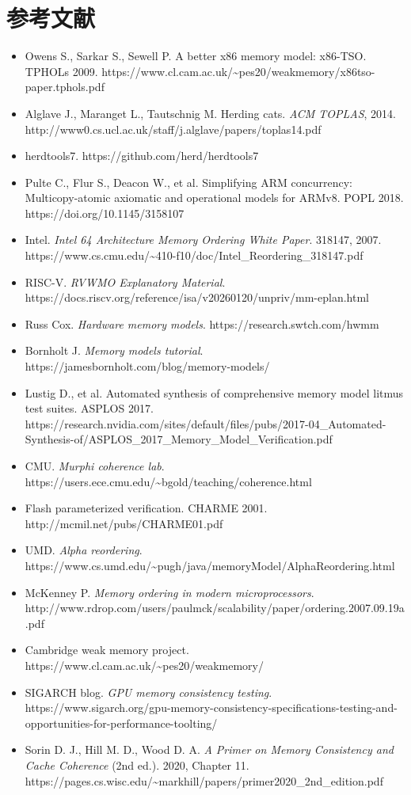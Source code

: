 \section*{参考文献}
\begin{itemize}
\item Owens S., Sarkar S., Sewell P. A better x86 memory model: x86-TSO. TPHOLs 2009. https://www.cl.cam.ac.uk/\textasciitilde{}pes20/weakmemory/x86tso-paper.tphols.pdf
\item Alglave J., Maranget L., Tautschnig M. Herding cats. \emph{ACM TOPLAS}, 2014. http://www0.cs.ucl.ac.uk/staff/j.alglave/papers/toplas14.pdf
\item herdtools7. https://github.com/herd/herdtools7
\item Pulte C., Flur S., Deacon W., et al. Simplifying ARM concurrency: Multicopy-atomic axiomatic and operational models for ARMv8. POPL 2018. https://doi.org/10.1145/3158107
\item Intel. \emph{Intel 64 Architecture Memory Ordering White Paper}. 318147, 2007. https://www.cs.cmu.edu/\textasciitilde{}410-f10/doc/Intel\_Reordering\_318147.pdf
\item RISC-V. \emph{RVWMO Explanatory Material}. https://docs.riscv.org/reference/isa/v20260120/unpriv/mm-eplan.html
\item Russ Cox. \emph{Hardware memory models}. https://research.swtch.com/hwmm
\item Bornholt J. \emph{Memory models tutorial}. https://jamesbornholt.com/blog/memory-models/
\item Lustig D., et al. Automated synthesis of comprehensive memory model litmus test suites. ASPLOS 2017. https://research.nvidia.com/sites/default/files/pubs/2017-04\_Automated-Synthesis-of/ASPLOS\_2017\_Memory\_Model\_Verification.pdf
\item CMU. \emph{Murphi coherence lab}. https://users.ece.cmu.edu/\textasciitilde{}bgold/teaching/coherence.html
\item Flash parameterized verification. CHARME 2001. http://mcmil.net/pubs/CHARME01.pdf
\item UMD. \emph{Alpha reordering}. https://www.cs.umd.edu/\textasciitilde{}pugh/java/memoryModel/AlphaReordering.html
\item McKenney P. \emph{Memory ordering in modern microprocessors}. http://www.rdrop.com/users/paulmck/scalability/paper/ordering.2007.09.19a.pdf
\item Cambridge weak memory project. https://www.cl.cam.ac.uk/\textasciitilde{}pes20/weakmemory/
\item SIGARCH blog. \emph{GPU memory consistency testing}. https://www.sigarch.org/gpu-memory-consistency-specifications-testing-and-opportunities-for-performance-toolting/
\item Sorin D. J., Hill M. D., Wood D. A. \emph{A Primer on Memory Consistency and Cache Coherence} (2nd ed.). 2020, Chapter 11. https://pages.cs.wisc.edu/\textasciitilde{}markhill/papers/primer2020\_2nd\_edition.pdf
\end{itemize}
